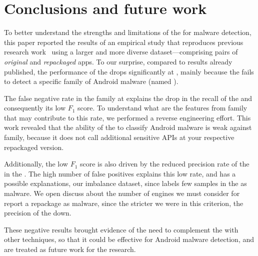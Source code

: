 \section{Conclusions and future work}\label{sec:conclusions}


To better understand the strengths and limitations of the \mas for malware detection, this paper reported the results of an empirical study that reproduces previous research work~\cite{DBLP:conf/wcre/BaoLL18,DBLP:journals/jss/CostaMMSSBNR22} using a larger and more diverse dataset---comprising \apps pairs of \emph{original} and \emph{repackaged} apps. To our surprise, compared to results already published, the performance of the \mas drops significantly at \cds, mainly because the \mas fails to detect a specific family of Android malware (named \gps). 

The false negative rate in the \gps family at \cds explains the drop in the recall of the \mas and consequently its low $F_1$ score. To understand what are the features from \gps family that may contribute to this rate, we performed a reverse engineering effort. This work revealed that the ability of the \mas to classify Android malware is weak against \gps family, because it does not call additional sensitive APIs at your respective repackaged version.

Additionally, the low $F_1$ score is also driven by the reduced precision rate of the \mas in the \cds. The high number of false positives explains this low rate, and has a possible explanations, our imbalance dataset, since \vt labels few samples in the \cds as malware. We open discuss about the number of engines we must consider for \vt report a repackage as malware, since the stricter we were in this criterion, the precision of the \mas down.

These negative results brought evidence of the need to complement the \mas with other techniques, so that it could be effective for Android malware detection, and are treated as future work for the research.
